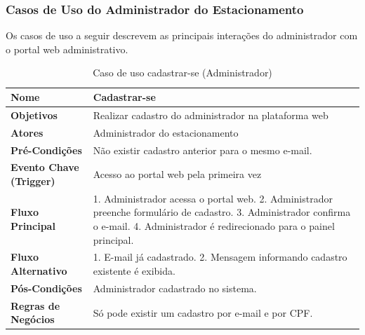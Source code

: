 \subsubsection{Casos de Uso do Administrador do Estacionamento}
\label{sec:casos-uso-administrador}

Os casos de uso a seguir descrevem as principais interações do administrador com o portal web administrativo.

\begin{table}[H]
\begin{center}
\caption{Caso de uso cadastrar-se (Administrador)}
\label{tab:caso-uso-cadastrar-admin}
\begin{tabular}{|p{4cm}|p{9cm}|}
\hline
\textbf{Nome} & Cadastrar-se \\
\hline
\textbf{Objetivos} & Realizar cadastro do administrador na plataforma web \\
\hline
\textbf{Atores} & Administrador do estacionamento \\
\hline
\textbf{Pré-Condições} & Não existir cadastro anterior para o mesmo e-mail. \\
\hline
\textbf{Evento Chave (Trigger)} & Acesso ao portal web pela primeira vez \\
\hline
\textbf{Fluxo Principal} & 1. Administrador acessa o portal web. 2. Administrador preenche formulário de cadastro. 3. Administrador confirma o e-mail. 4. Administrador é redirecionado para o painel principal. \\
\hline
\textbf{Fluxo Alternativo} & 1. E-mail já cadastrado. 2. Mensagem informando cadastro existente é exibida. \\
\hline
\textbf{Pós-Condições} & Administrador cadastrado no sistema. \\
\hline
\textbf{Regras de Negócios} & Só pode existir um cadastro por e-mail e por CPF. \\
\hline
\end{tabular}
\end{center}
\end{table}

